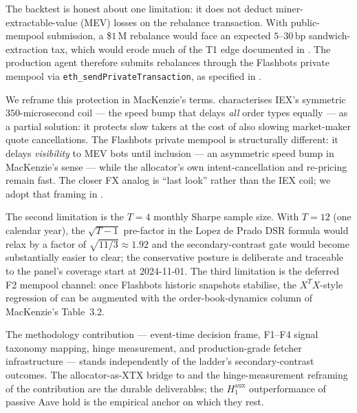 The backtest is honest about one limitation: it does not deduct
miner-extractable-value (MEV) losses on the rebalance
transaction.  With public-mempool submission, a \$$1$\,M
rebalance would face an expected $5$--$30$\,bp sandwich-extraction
tax, which would erode much of the T1 edge documented in
.  The production agent therefore submits
rebalances through the Flashbots private mempool via
\texttt{eth\_sendPrivateTransaction}, as specified in
.

We reframe this protection in MacKenzie's terms.
\cite[pp.\,200--203]{mackenzie2021} characterises IEX's symmetric
$350$-microsecond coil --- the speed bump that delays \emph{all}
order types equally --- as a partial solution: it protects slow
takers at the cost of also slowing market-maker quote
cancellations.  The Flashbots private mempool is structurally
different: it delays \emph{visibility} to MEV bots until
inclusion --- an asymmetric speed bump in MacKenzie's sense ---
while the allocator's own intent-cancellation and re-pricing
remain fast.  The closer FX analog is ``last look'' rather than
the IEX coil; we adopt that framing in
.

The second limitation is the $T = 4$ monthly Sharpe sample size.
With $T = 12$ (one calendar year), the $\sqrt{T-1}$ pre-factor
in the Lopez de Prado DSR formula
\cite[Ch.\,14.7.3]{lopezdeprado2018} would relax by a factor of
$\sqrt{11/3} \approx 1.92$ and the secondary-contrast gate would
become substantially easier to clear; the conservative posture is
deliberate and traceable to the panel's coverage start at
2024-11-01.  The third limitation is the deferred F2 mempool
channel: once Flashbots historic snapshots stabilise, the
$X^{T} X$-style regression of \cite[p.\,176]{mackenzie2021} can
be augmented with the order-book-dynamics column of MacKenzie's
Table~3.2.

The methodology contribution --- event-time decision frame,
F1--F4 signal taxonomy mapping, hinge measurement, and
production-grade fetcher infrastructure --- stands independently
of the ladder's secondary-contrast outcomes.  The
allocator-as-XTX bridge to \cite{mackenzie2021} and the
hinge-measurement reframing of the contribution are the durable
deliverables; the $H_{1}^{\text{aux}}$ outperformance of passive
Aave hold is the empirical anchor on which they rest.

